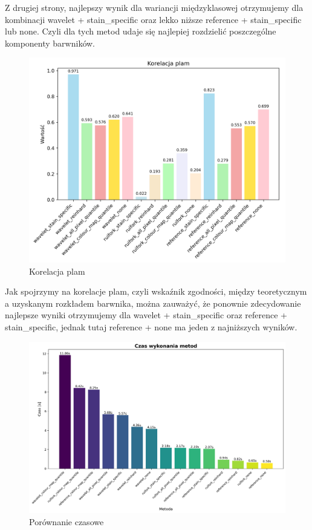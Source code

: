 \documentclass{article}
\begin{document}
Z drugiej strony, najlepszy wynik dla wariancji międzyklasowej otrzymujemy dla kombinacji wavelet + stain\_specific oraz lekko niższe reference + stain\_specific lub none. Czyli dla tych metod udaje się najlepiej rozdzielić poszczególne komponenty barwników.

\begin{figure}[H]
    \centering
    \includegraphics[width=0.75\linewidth]{korelacja.png} %
    \caption{Korelacja plam}
    \label{fig:korelacja}
\end{figure}

Jak spojrzymy na korelacje plam, czyli wskaźnik zgodności, między teoretycznym a uzyskanym rozkładem barwnika, można zauważyć, że ponownie zdecydowanie najlepsze wyniki otrzymujemy dla wavelet + stain\_specific oraz reference + stain\_specific, jednak tutaj reference + none ma jeden z najniższych wyników.

\begin{figure}[H]
    \centering
    \includegraphics[width=0.75\linewidth]{quantitative_timing_comparison.png} %
    \caption{Porównanie czasowe}
    \label{fig:timing_comparison}
\end{figure}
\end{document}
